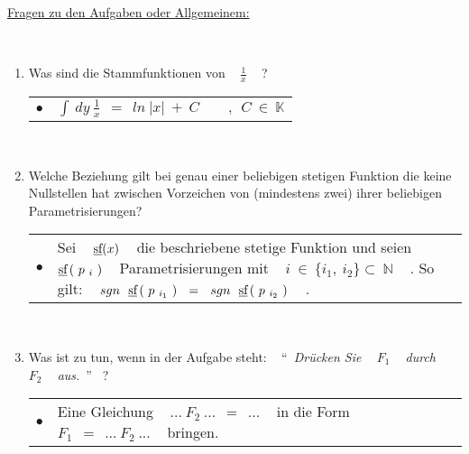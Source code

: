 


\newpage



\chapter{~}


\underline{Fragen zu den Aufgaben oder Allgemeinem:}

~\\

\begin{enumerate}
	
	\item Was sind die Stammfunktionen von ~ $\frac{1}{x}$ ~ ? \\
	
	\begin{tabularx}{0.88\textwidth}{lX}
		$\bullet$ & $\int ~ dy ~ \frac{1}{x} ~~ = ~~ ln ~ \left| x \right| ~ + ~ C \qquad, ~~ C ~ \in ~ \mathbb{K}$
	\end{tabularx}
	
	~\\
	
	\item Welche Beziehung gilt bei genau einer beliebigen stetigen Funktion die keine Nullstellen hat zwischen Vorzeichen von (mindestens zwei) ihrer beliebigen Parametrisierungen? \\
	
	\begin{tabularx}{0.88\textwidth}{lX}
		$\bullet$ & Sei ~ $\text{\underline{sf}}(x)$ ~ die beschriebene stetige Funktion und seien ~ $\text{\underline{sf}}\left(~ p_{~ i} ~\right)$ ~ Parametrisierungen mit ~ $i ~ \in ~ \{ i_1, ~ i_2 \} \subset ~ \mathbb{N}$ ~ . So gilt: \newline\newline ~ $sgn ~~ \text{\underline{sf}}\left(~ p_{~ i_1} ~\right) ~~ = ~~ sgn ~~ \text{\underline{sf}}\left(~ p_{~ i_2} ~\right)$ ~ .
	\end{tabularx}
	
	~\\
	
	\item Was ist zu tun, wenn in der Aufgabe steht: ~ \textquotedblleft~\textit{Drücken Sie ~ $F_1$ ~ durch ~ $F_2$ ~ aus.}~\textquotedblright ~ ? \\
	
	\begin{tabularx}{0.88\textwidth}{lX}
		$\bullet$ & Eine Gleichung ~ $... ~ F_2 ~ ... ~~ = ~~ ...$ ~ in die Form ~ $F_1 ~~ = ~~ ... ~ F_2 ~ ...$ ~ bringen.
	\end{tabularx}
	

\end{enumerate}

